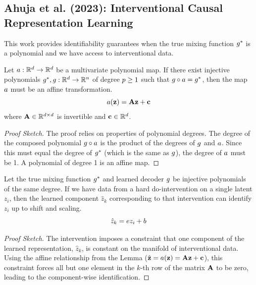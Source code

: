 \documentclass{article}
\begin{document}
\subsection{Ahuja et al. (2023): Interventional Causal Representation Learning}
This work provides identifiability guarantees when the true mixing function $g^*$ is a polynomial and we have access to interventional data.

\begin{lemma}
Let $a: \mathbb{R}^{d} \to \mathbb{R}^{d}$ be a multivariate polynomial map. If there exist injective polynomials $g^*, g: \mathbb{R}^{d} \to \mathbb{R}^{n}$ of degree $p \geq 1$ such that $g \circ a = g^*$, then the map $a$ must be an affine transformation.
$$
\composedfunc(\latentvars) = \affinetransform\latentvars + \affineoffset
$$
where $\affinetransform \in \mathbb{R}^{\latentdim \times \latentdim}$ is invertible and $\affineoffset \in \mathbb{R}^{\latentdim}$.
\end{lemma}
\begin{proof}[Proof Sketch]
The proof relies on properties of polynomial degrees. The degree of the composed polynomial $g \circ a$ is the product of the degrees of $g$ and $a$. Since this must equal the degree of $g^*$ (which is the same as $g$), the degree of $a$ must be 1. A polynomial of degree 1 is an affine map.
\end{proof}

\begin{theorem}
Let the true mixing function $g^*$ and learned decoder $g$ be injective polynomials of the same degree. If we have data from a hard do-intervention on a single latent $z_i$, then the learned component $\hat{z}_k$ corresponding to that intervention can identify $z_i$ up to shift and scaling.
$$
\hat{z}_k = e z_i + b
$$
\end{theorem}
\begin{proof}[Proof Sketch]
The intervention imposes a constraint that one component of the learned representation, $\hat{z}_k$, is constant on the manifold of interventional data. Using the affine relationship from the Lemma ($\learnedrepresentation = \composedfunc(\latentvars) = \affinetransform\latentvars + \affineoffset$), this constraint forces all but one element in the $k$-th row of the matrix $\affinetransform$ to be zero, leading to the component-wise identification.
\end{proof}
\end{document}
